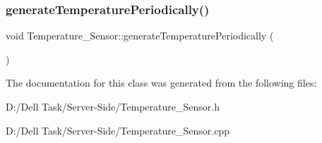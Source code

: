 \subsubsection{\texorpdfstring{generate\+Temperature\+Periodically()}{generateTemperaturePeriodically()}}
{\footnotesize\ttfamily void Temperature\+\_\+\+Sensor\+::generate\+Temperature\+Periodically (\begin{DoxyParamCaption}{ }\end{DoxyParamCaption})}







The documentation for this class was generated from the following files\+:\begin{DoxyCompactItemize}
\item 
D\+:/\+Dell Task/\+Server-\/\+Side/Temperature\+\_\+\+Sensor.\+h\item 
D\+:/\+Dell Task/\+Server-\/\+Side/Temperature\+\_\+\+Sensor.\+cpp\end{DoxyCompactItemize}
